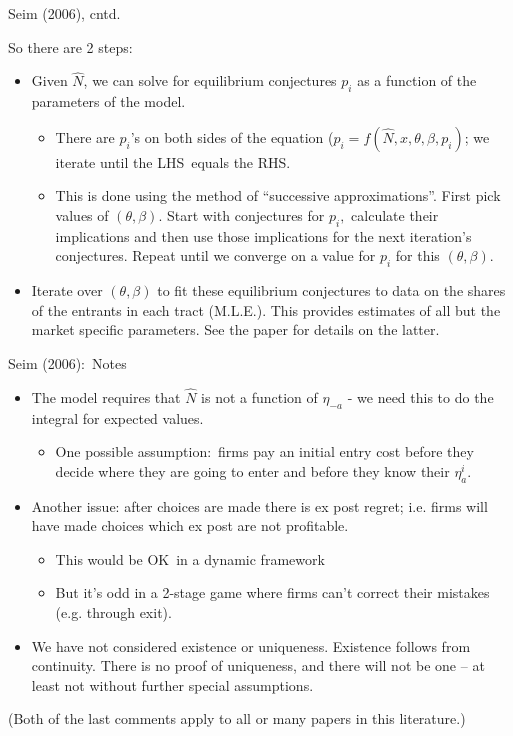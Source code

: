 \begin{frame}{Seim (2006), cntd.}

So there are 2 steps:
\begin{itemize}
\item Given $\hat{N}$, we can solve for equilibrium conjectures $p_{i}$ as a
function of the parameters of the model.
\begin{itemize}
\item There are $p_{i}$'s on both sides of the equation ($p_{i}=f(\hat{N}%
,x,\theta ,\beta ,p_{i})$; we iterate until the LHS\ equals the RHS.
\item This is done using the method of \textquotedblleft successive
approximations\textquotedblright . First pick values of $(\theta ,\beta )$.
Start with conjectures for $p_{i},$ calculate their implications and then
use those implications for the next iteration's conjectures. Repeat until we
converge on a value for $p_{i}$ for this $(\theta ,\beta ).$
\end{itemize}
\item Iterate over $(\theta ,\beta )$ to fit these equilibrium conjectures
to data on the shares of the entrants in each tract (M.L.E.). This provides
estimates of all but the market specific parameters. See the paper for
details on the latter.
\end{itemize}
\end{frame}


\begin{frame}{Seim (2006):\ Notes}
\begin{itemize}
\item The model requires that $\hat{N}$ is not a function of $\eta _{-a}$ -
we need this to do the integral for expected values.
\begin{itemize}
\item One possible assumption:\ firms pay an initial entry cost before they
decide where they are going to enter and before they know their $\eta
_{a}^{i}$.
\end{itemize}
\item Another issue: after choices are made there is ex post regret; i.e.
firms will have made choices which ex post are not profitable.
\begin{itemize}
\item This would be OK\ in a dynamic framework
\item But it's odd in a 2-stage game where firms can't correct their
mistakes (e.g. through exit).
\end{itemize}
\item We have not considered existence or uniqueness. Existence follows from
continuity. There is no proof of uniqueness, and there will not be one -- at
least not without further special assumptions.
\end{itemize}
(Both of the last comments apply to all or many papers in this literature.)
\end{frame}%

